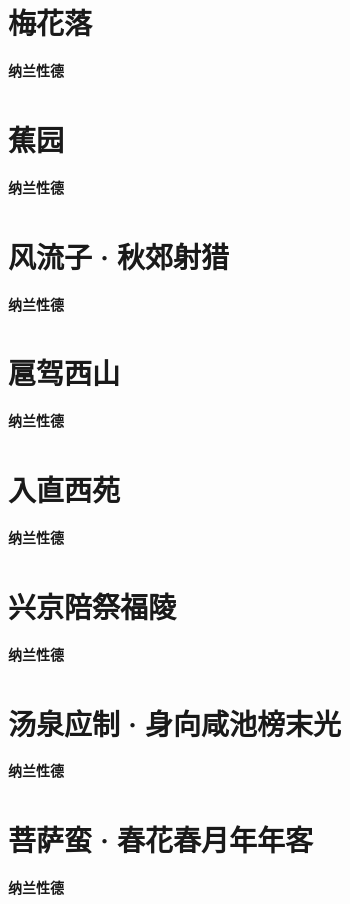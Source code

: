 \documentclass[12pt,a4paper]{ctexbook}
\begin{document}
\section{梅花落}
\textbf{纳兰性德}\par\vspace{0.5em}

\section{蕉园}
\textbf{纳兰性德}\par\vspace{0.5em}

\section{风流子·秋郊射猎}
\textbf{纳兰性德}\par\vspace{0.5em}

\section{扈驾西山}
\textbf{纳兰性德}\par\vspace{0.5em}

\section{入直西苑}
\textbf{纳兰性德}\par\vspace{0.5em}

\section{兴京陪祭福陵}
\textbf{纳兰性德}\par\vspace{0.5em}

\section{汤泉应制·身向咸池榜末光}
\textbf{纳兰性德}\par\vspace{0.5em}

\section{菩萨蛮·春花春月年年客}
\textbf{纳兰性德}\par\vspace{0.5em}
\end{document}
